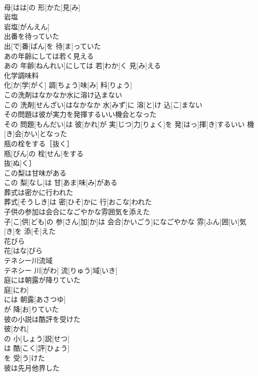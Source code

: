\documentclass[8pt]{extreport}
\begin{document}
\begin{CJK}{UTF8}{min}
\\	母[はは]の 形[かた]見[み]
\\	岩塩	
\\	岩塩[がんえん]
\\	出番を待っていた	
\\	出[で]番[ばん]を 待[ま]っていた
\\	あの年齢にしては若く見える	
\\	あの 年齢[ねんれい]にしては 若[わか]く 見[み]える
\\	化学調味料	
\\	化[か]学[がく] 調[ちょう]味[み] 料[りょう]
\\	この洗剤はなかなか水に溶け込まない	
\\	この 洗剤[せんざい]はなかなか 水[みず]に 溶[と]け 込[こ]まない
\\	その問題は彼が実力を発揮するいい機会となった	
\\	その 問題[もんだい]は 彼[かれ]が 実[じつ]力[りょく]を 発[はっ]揮[き]するいい 機[き]会[かい]となった
\\	瓶の栓をする［抜く］	
\\	瓶[びん]の 栓[せん]をする
\\	抜[ぬ]く］
\\	この梨は甘味がある	
\\	この 梨[なし]は 甘[あま]味[み]がある
\\	葬式は密かに行われた	
\\	葬式[そうしき]は 密[ひそ]かに 行[おこな]われた
\\	子供の参加は会合になごやかな雰囲気を添えた	
\\	子[こ]供[ども]の 参[さん]加[か]は 会合[かいごう]になごやかな 雰[ふん]囲[い]気[き]を 添[そ]えた
\\	花びら	
\\	花[はな]びら
\\	テネシー川流域	
\\	テネシー 川[がわ] 流[りゅう]域[いき]
\\	庭には朝露が降りていた	
\\	庭[にわ] 
\\	には 朝露[あさつゆ] 
\\	が 降[お]りていた 
\\	彼の小説は酷評を受けた	
\\	彼[かれ]
\\	の 小[しょう]説[せつ]
\\	は 酷[こく]評[ひょう]
\\	を 受[う]けた 
\\	彼は先月他界した	

\end{CJK}
\end{document}
